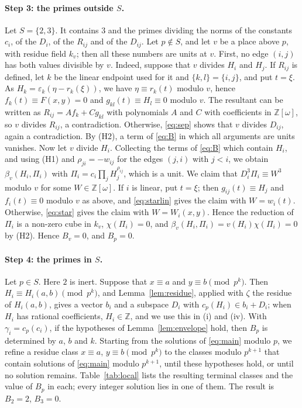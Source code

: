 \documentclass[11pt]{article}
\newcommand{\Z}{\mathbb{Z}}
\begin{document}
\paragraph{Step 3: the primes outside $S$.} Let $S=\{2,3\}$. It contains $3$ and the primes dividing the norms of the constants $c_i$, of the $D_i$, of the $R_{ij}$ and of the $D_{ij}$. Let $p\notin S$, and let $v$ be a place above $p$, with residue field $k_v$; then all these numbers are units at $v$. First, no edge $(i,j)$ has both values divisible by $v$. Indeed, suppose that $v$ divides $H_i$ and $H_j$. If $R_{ij}$ is defined, let $k$ be the linear endpoint used for it and $\{k,l\}=\{i,j\}$, and put $t=\xi$. As $H_k=\varepsilon_k(\eta-r_k(\xi))$, we have $\eta\equiv r_k(t)$ modulo $v$, hence $f_k(t)\equiv F(x,y)=0$ and $g_{kl}(t)\equiv H_l\equiv0$ modulo $v$. The resultant can be written as $R_{ij}=Af_k+Cg_{kl}$ with polynomials $A$ and $C$ with coefficients in $\Z[\omega]$, so $v$ divides $R_{ij}$, a contradiction. Otherwise, \eqref{eq:sep} shows that $v$ divides $D_{ij}$, again a contradiction. By (H2), a term of \eqref{eq:B} in which all arguments are units vanishes. Now let $v$ divide $H_i$. Collecting the terms of \eqref{eq:B} which contain $H_i$, and using (H1) and $\rho_{ji}=-w_{ij}$ for the edges $(j,i)$ with $j<i$, we obtain $\beta_v(H_i,\Pi_i)$ with $\Pi_i=c_i\prod_jH_j^{\rho_{ij}}$, which is a unit. We claim that $D_i^3\Pi_i\equiv W^3$ modulo $v$ for some $W\in\Z[\omega]$. If $i$ is linear, put $t=\xi$; then $g_{ij}(t)\equiv H_j$ and $f_i(t)\equiv0$ modulo $v$ as above, and \eqref{eq:starlin} gives the claim with $W=w_i(t)$. Otherwise, \eqref{eq:star} gives the claim with $W=W_i(x,y)$. Hence the reduction of $\Pi_i$ is a non-zero cube in $k_v$, $\chi(\Pi_i)=0$, and $\beta_v(H_i,\Pi_i)=v(H_i)\chi(\Pi_i)=0$ by (H2). Hence $B_v=0$, and $B_p=0$.

\paragraph{Step 4: the primes in $S$.} Let $p\in S$. Here $2$ is inert. Suppose that $x\equiv a$ and $y\equiv b\pmod{p^k}$. Then $H_i\equiv H_i(a,b)\pmod{p^k}$, and Lemma~\ref{lem:residue}, applied with $\zeta$ the residue of $H_i(a,b)$, gives a vector $b_i$ and a subspace $D_i$ with $c_p(H_i)\in b_i+D_i$; when $H_i$ has rational coefficients, $H_i\in\Z$, and we use this in (i) and (iv). With $\gamma_i=c_p(c_i)$, if the hypotheses of Lemma~\ref{lem:envelope} hold, then $B_p$ is determined by $a$, $b$ and $k$. Starting from the solutions of \eqref{eq:main} modulo $p$, we refine a residue class $x\equiv a$, $y\equiv b\pmod{p^k}$ to the classes modulo $p^{k+1}$ that contain solutions of \eqref{eq:main} modulo $p^{k+1}$, until these hypotheses hold, or until no solution remains. Table~\ref{tab:local} lists the resulting terminal classes and the value of $B_p$ in each; every integer solution lies in one of them. The result is $B_{2}=2$, $B_{3}=0$.
\end{document}
